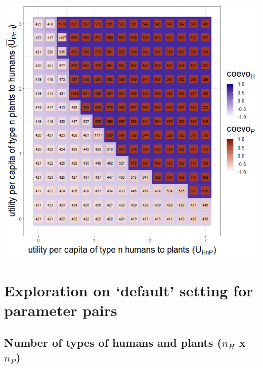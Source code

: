 \documentclass[
]{book}
\begin{document}
\newpage

\includegraphics[width=1\linewidth]{plots/3_exp_utility_per_capita_type_n-tripleRaster_twoParameters}

\newpage

\hypertarget{exploration-on-default-setting-for-parameter-pairs}{%
\section{Exploration on `default' setting for parameter pairs}\label{exploration-on-default-setting-for-parameter-pairs}}

\hypertarget{number-of-types-of-humans-and-plants-n_h-x-n_p}{%
\subsection{\texorpdfstring{Number of types of humans and plants (\(n_{H}\) x \(n_{P}\))}{Number of types of humans and plants (n\_\{H\} x n\_\{P\})}}\label{number-of-types-of-humans-and-plants-n_h-x-n_p}}

\end{document}

